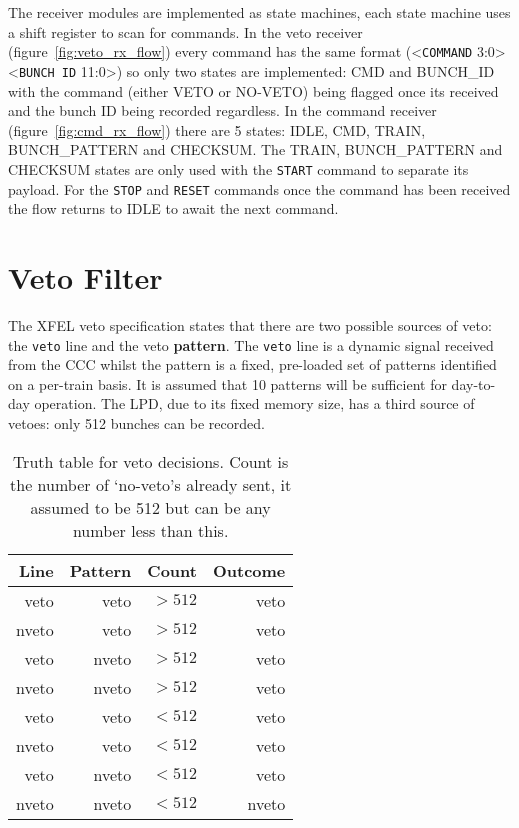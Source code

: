 \documentclass[]{article}
\begin{document}
    The receiver modules are implemented as state machines, each state machine uses a shift register to scan for commands. In the veto receiver (figure~\ref{fig:veto_rx_flow}) every command has the same format (<\texttt{COMMAND} 3:0><\texttt{BUNCH~ID} 11:0>) so only two states are implemented: CMD and BUNCH\_ID with the command (either VETO or NO-VETO) being flagged once its received and the bunch ID being recorded regardless. In the command receiver (figure~\ref{fig:cmd_rx_flow}) there are 5 states: IDLE, CMD, TRAIN, BUNCH\_PATTERN and CHECKSUM. The TRAIN, BUNCH\_PATTERN and CHECKSUM states are only used with the \texttt{START} command to separate its payload. For the \texttt{STOP} and \texttt{RESET} commands once the command has been received the flow returns to IDLE to await the next command.   
    \section{Veto Filter} %
    \label{sec:veto_filter}
    The XFEL veto specification states that there are two possible sources of veto: the \texttt{veto} line and the veto \textbf{pattern}. The \texttt{veto} line is a dynamic signal received from the CCC whilst the pattern is a fixed, pre-loaded set of patterns identified on a per-train basis. It is assumed that 10 patterns will be sufficient for day-to-day operation. The LPD, due to its fixed memory size, has a third source of vetoes: only 512 bunches can be recorded. 
    
    \begin{table}
        \begin{center}
        \begin{tabular}{r|r|r||r}
            Line  & Pattern &   Count  & Outcome \\
            \hline
             veto &   veto  & \(>512\) & veto  \\
            nveto &   veto  & \(>512\) & veto  \\
             veto &  nveto  & \(>512\) & veto  \\
            nveto &  nveto  & \(>512\) & veto  \\
             veto &   veto  & \(<512\) & veto  \\
            nveto &   veto  & \(<512\) & veto  \\
             veto &  nveto  & \(<512\) & veto  \\
            nveto &  nveto  & \(<512\) & nveto \\
            
        \end{tabular}
        \end{center}
        \caption{Truth table for veto decisions. Count is the number of `no-veto's already sent, it assumed to be 512 but can be any number less than this.}
        \label{tab:veto_truth_table}
    \end{table}
\end{document}
